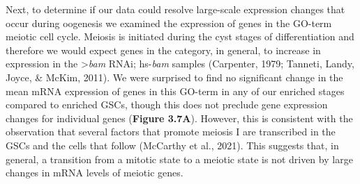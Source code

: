 \documentclass[12pt,oneside]{reedthesis}
\begin{document}
Next, to determine if our data could resolve large-scale expression
changes that occur during oogenesis we examined the expression of genes
in the GO-term meiotic cell cycle. Meiosis is initiated during the cyst
stages of differentiation and therefore we would expect genes in the
category, in general, to increase in expression in the \textgreater{}\emph{bam} RNAi;
hs-\emph{bam} samples (Carpenter, 1979; Tanneti, Landy, Joyce, \& McKim, 2011). We were surprised to find no
significant change in the mean mRNA expression of genes in this GO-term
in any of our enriched stages compared to enriched GSCs, though this
does not preclude gene expression changes for individual genes
(\textbf{Figure 3.7A}). However, this is consistent with the
observation that several factors that promote meiosis I are transcribed
in the GSCs and the cells that follow
(McCarthy et al., 2021). This suggests that, in general,
a transition from a mitotic state to a meiotic state is not driven by
large changes in mRNA levels of meiotic genes.
\end{document}
